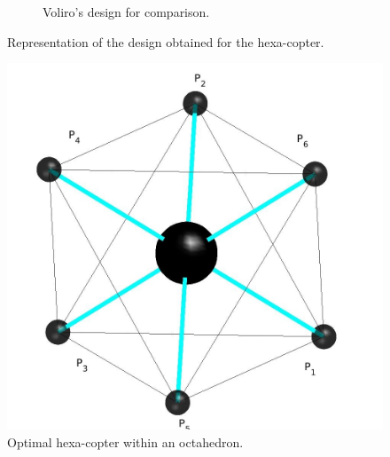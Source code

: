 \begin{figure}[!ht]
\begin{subfigure}[b]{0.55\textwidth}
    \caption{Voliro's design for comparison.} \label{fig:Hexacopter_resultc}
  \end{subfigure}
  \caption{Representation of the design obtained for the hexa-copter.}
  \label{fig:Hexacopter_result}
\end{figure}

\begin{figure}[!ht]
  \centering
  \includegraphics[width=0.45\linewidth]{images/Hexa_octahedron.jpg}
  \caption{Optimal hexa-copter within an octahedron.}
  \label{fig:Hexacopter_resultb}
\end{figure}

